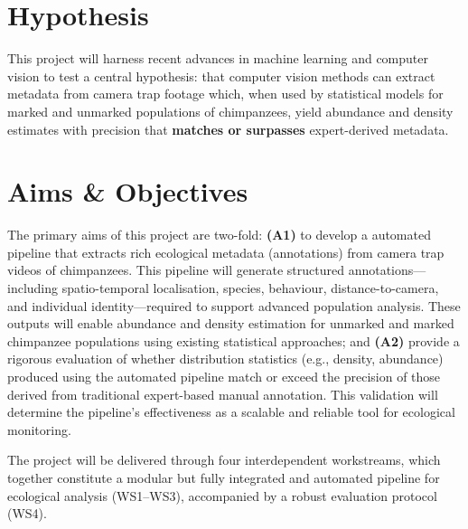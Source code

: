 \documentclass{article}
\begin{document}
\section{Hypothesis}

This project will harness recent advances in machine learning and computer vision to test a central hypothesis: that computer vision methods can extract metadata from camera trap footage which, when used by statistical models for marked and unmarked populations of chimpanzees, yield abundance and density estimates with precision that \textbf{matches or surpasses} expert-derived metadata.

\section{Aims \& Objectives}

The primary aims of this project are two-fold: \textbf{(A1)} to develop a automated pipeline that extracts rich ecological metadata (annotations) from camera trap videos of chimpanzees. This pipeline will generate structured annotations—including spatio-temporal localisation, species, behaviour, distance-to-camera, and individual identity—required to support advanced population analysis. These outputs will enable abundance and density estimation for unmarked and marked chimpanzee populations using existing statistical approaches; and \textbf{(A2)} provide a rigorous evaluation of whether distribution statistics (e.g., density, abundance) produced using the automated pipeline match or exceed the precision of those derived from traditional expert-based manual annotation. This validation will determine the pipeline’s effectiveness as a scalable and reliable tool for ecological monitoring.

The project will be delivered through four interdependent workstreams, which together constitute a modular but fully integrated and automated pipeline for ecological analysis (WS1–WS3), accompanied by a robust evaluation protocol (WS4).
\end{document}
